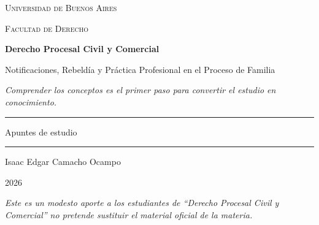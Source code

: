 \documentclass[12pt,oneside]{book}
\newcommand{\universidad}{Universidad de Buenos Aires}
\newcommand{\facultad}{Facultad de Derecho}
\newcommand{\materia}{Derecho Procesal Civil y Comercial}
\newcommand{\titulo}{Notificaciones, Rebeld\'ia y Pr\'actica Profesional en el Proceso de Familia}
\newcommand{\autor}{Isaac Edgar Camacho Ocampo}
\newcommand{\anio}{2026}
\begin{document}
\begin{titlepage}

\thispagestyle{empty}

\begin{center}

\vspace*{1cm}

{\large \textsc{\universidad}}

\vspace{0.2cm}

{\large \textsc{\facultad}}

\vspace{3cm}

{\Huge \textbf{\materia}}

\vspace{1cm}

{\LARGE \titulo}

\vspace{0.8cm}

\textit{Comprender los conceptos es el primer paso para convertir el estudio en conocimiento.}

\vspace{1.2cm}

\rule{0.70\textwidth}{0.5pt}

\vspace{0.5cm}

{\large Apuntes de estudio}

\vspace{0.5cm}

\rule{0.70\textwidth}{0.5pt}

\vfill

{\large \autor}

\vspace{0.3cm}

{\large \anio}

\end{center}

\vfill

\begin{flushleft}
\textit{Este es un modesto aporte a los estudiantes de ``Derecho Procesal Civil y Comercial'' no pretende sustituir el material oficial de la materia.}
\end{flushleft}

\end{titlepage}

\tableofcontents
\end{document}
